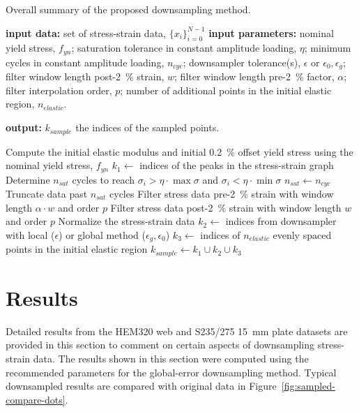 \documentclass[a4paper,11pt]{article}
\begin{document}
\begin{algorithm}
	\caption{Overall summary of the proposed downsampling method.}
	\label{alg:overall-summary}
	\begin{algorithmic}[1]
        \State \textbf{input data:} set of stress-strain data, $\{x_i\}_{i=0}^{N-1}$
        \State \textbf{input parameters:} nominal yield stress, $f_{yn}$; saturation tolerance in constant amplitude loading, $\eta$; minimum cycles in constant amplitude loading, $n_{cyc}$; downsampler tolerance(s), $\epsilon$ or $\epsilon_0, \epsilon_g$; filter window length post-2~\% strain, $w$; filter window length pre-2~\% factor, $\alpha$; filter interpolation order, $p$; number of additional points in the initial elastic region, $n_{elastic}$.

        \State \textbf{output:} $k_{sample}$ the indices of the sampled points.
        \bigskip

        \State Compute the initial elastic modulus and initial 0.2~\% offset yield stress using the nominal yield stress, $f_{yn}$
        \State $k_{1} \gets $ indices of the peaks in the stress-strain graph
            \State Determine $n_{sat}$ cycles to reach $\sigma_i > \eta \cdot \max \sigma$ and $\sigma_i < \eta \cdot \min \sigma$
                \State $n_{sat} \gets n_{cyc}$
            \EndIf
            \State Truncate data past $n_{sat}$ cycles
        \EndIf
        \State Filter stress data pre-2~\% strain with window length $\alpha \cdot w$ and order $p$
        \State Filter stress data post-2~\% strain with window length $w$ and order $p$
        \State Normalize the stress-strain data
        \State $k_2 \gets$ indices from downsampler with local ($\epsilon$) or global method ($\epsilon_g, \epsilon_0$) \label{algline:downsampler}
        \State $k_3 \gets$ indices of $n_{elastic}$ evenly spaced points in the initial elastic region
        \State $k_{sample} \gets k_1 \cup k_2 \cup k_3$
    \end{algorithmic}
\end{algorithm}



\section{Results}

Detailed results from the HEM320 web and S235/275 15~mm plate datasets are provided in this section to comment on certain aspects of downsampling stress-strain data.
The results shown in this section were computed using the recommended parameters for the global-error downsampling method.
Typical downsampled results are compared with original data in Figure~\ref{fig:sampled-compare-dots}.
\end{document}
